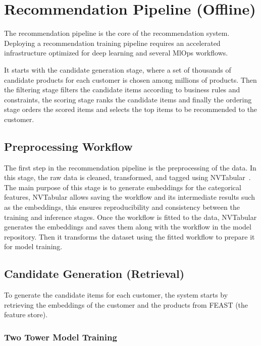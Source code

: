 
\section{Recommendation Pipeline (Offline)}

The recommendation pipeline is the core of the recommendation system.
Deploying a recommendation training pipeline requires an accelerated infrastructure optimized for deep learning and several MlOps workflows.

It starts with the candidate generation stage, where a set of thousands of candidate products for each customer is chosen among millions of products.
Then the filtering stage filters the candidate items according to business rules and constraints, the scoring stage ranks the candidate items and finally the ordering stage orders 
the scored items and selects the top items to be recommended to the customer.

\subsection{Preprocessing Workflow}

The first step in the recommendation pipeline is the preprocessing of the data. 
In this stage, the raw data is cleaned, transformed, and tagged using NVTabular~\cite{MerlinNVTabular}.
The main purpose of this stage is to generate embeddings for the categorical features,
NVTabular allows saving the workflow and its intermediate results such as the embeddings, this ensures reproducibility and consistency between the training and inference stages.
Once the workflow is fitted to the data, NVTabular generates the embeddings and saves them along with the workflow in the model repository.
Then it transforms the dataset using the fitted workflow to prepare it for model training.


\subsection{Candidate Generation (Retrieval)}

To generate the candidate items for each customer, the system starts by retrieving the embeddings of the customer and the products from FEAST (the feature store).

\subsubsection{Two Tower Model Training}

